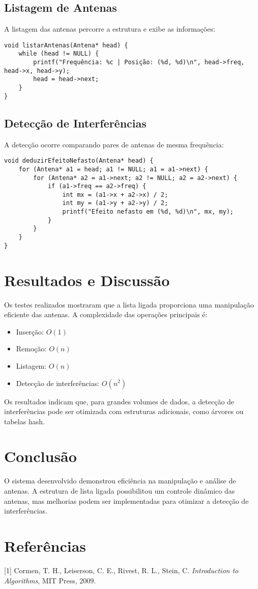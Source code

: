 \documentclass[12pt]{article}
\begin{document}
\subsection{Listagem de Antenas}
A listagem das antenas percorre a estrutura e exibe as informações:

\begin{lstlisting}[caption=Função para listar antenas]
void listarAntenas(Antena* head) {
    while (head != NULL) {
        printf("Frequência: %c | Posição: (%d, %d)\n", head->freq, head->x, head->y);
        head = head->next;
    }
}
\end{lstlisting}

\subsection{Detecção de Interferências}

A detecção ocorre comparando pares de antenas de mesma frequência:

\begin{lstlisting}[caption=Função para detectar interferências]
void deduzirEfeitoNefasto(Antena* head) {
    for (Antena* a1 = head; a1 != NULL; a1 = a1->next) {
        for (Antena* a2 = a1->next; a2 != NULL; a2 = a2->next) {
            if (a1->freq == a2->freq) {
                int mx = (a1->x + a2->x) / 2;
                int my = (a1->y + a2->y) / 2;
                printf("Efeito nefasto em (%d, %d)\n", mx, my);
            }
        }
    }
}
\end{lstlisting}

\section{Resultados e Discussão}
Os testes realizados mostraram que a lista ligada proporciona uma manipulação eficiente das antenas. A complexidade das operações principais é:
\begin{itemize}
    \item Inserção: $O(1)$
    \item Remoção: $O(n)$
    \item Listagem: $O(n)$
    \item Detecção de interferências: $O(n^2)$
\end{itemize}

Os resultados indicam que, para grandes volumes de dados, a detecção de interferências pode ser otimizada com estruturas adicionais, como árvores ou tabelas hash.

\section{Conclusão}
O sistema desenvolvido demonstrou eficiência na manipulação e análise de antenas. A estrutura de lista ligada possibilitou um controle dinâmico das antenas, mas melhorias podem ser implementadas para otimizar a detecção de interferências.

\section{Referências}
[1] Cormen, T. H., Leiserson, C. E., Rivest, R. L., Stein, C. \textit{Introduction to Algorithms}, MIT Press, 2009.
\end{document}
